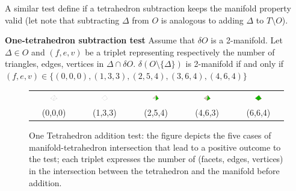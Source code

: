 A similar test define if a tetrahedron subtraction keeps the manifold property valid (let note that subtracting $\Delta$ from $O$ is analogous to adding $\Delta$ to $T \setminus O$).


\begin{thm}
  \textbf{One-tetrahedron subtraction test}   
  Assume that $\delta O$ is a 2-manifold. Let $\Delta \in O$ and $(f,e,v)$ be a triplet representing respectively the number of triangles, edges, vertices in $ \Delta \cap \delta O$.
  $\delta (O \setminus \{ \Delta \})$ is 2-manifold if and only if  $(f,e,v) \in  \{(0, 0, 0),\allowbreak (1, 3, 3),\allowbreak (2, 5, 4),\allowbreak (3, 6, 4),\allowbreak (4, 6, 4)\}$
\end{thm}

\begin{figure}
 \begin{tabular}{ccccc}
  \includegraphics[width=0.15\textwidth]{./img/maniftest01}&
  \includegraphics[width=0.15\textwidth]{./img/maniftest02}&
  \includegraphics[width=0.15\textwidth]{./img/maniftest03}&
  \includegraphics[width=0.15\textwidth]{./img/maniftest04}&
  \includegraphics[width=0.15\textwidth]{./img/maniftest05}\\
  (0,0,0) & (1,3,3) & (2,5,4) & (4,6,3) & (6,6,4)
 \end{tabular}
 \caption{One Tetrahedron addition test: the figure depicts the five cases of manifold-tetrahedron intersection that lead to a positive outcome to the test; each triplet expresses the number of (facets, edges, vertices) in the intersection between the tetrahedron and the manifold before addition.}
 \label{fig:maniftest}
 
\end{figure}


